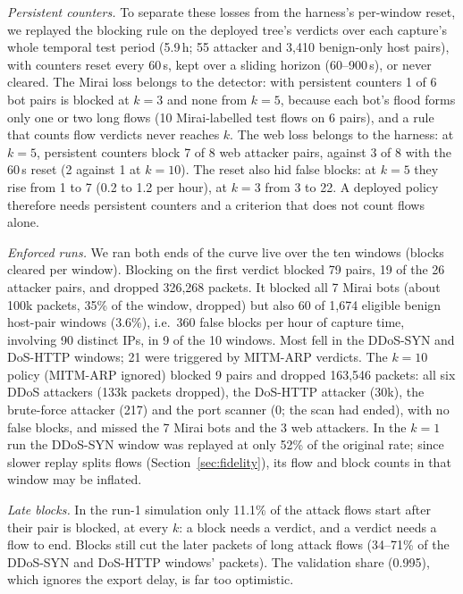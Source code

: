 \emph{Persistent counters.} To separate these losses from the harness's per-window reset, we replayed the blocking rule on the deployed tree's verdicts over each capture's whole temporal test period (5.9\,h; 55 attacker and 3,410 benign-only host pairs), with counters reset every 60\,s, kept over a sliding horizon (60--900\,s), or never cleared. The Mirai loss belongs to the detector: with persistent counters 1 of 6 bot pairs is blocked at $k=3$ and none from $k=5$, because each bot's flood forms only one or two long flows (10 Mirai-labelled test flows on 6 pairs), and a rule that counts flow verdicts never reaches $k$. The web loss belongs to the harness: at $k=5$, persistent counters block 7 of 8 web attacker pairs, against 3 of 8 with the 60\,s reset (2 against 1 at $k=10$). The reset also hid false blocks: at $k=5$ they rise from 1 to 7 (0.2 to 1.2 per hour), at $k=3$ from 3 to 22. A deployed policy therefore needs persistent counters and a criterion that does not count flows alone.

\emph{Enforced runs.} We ran both ends of the curve live over the ten windows (blocks cleared per window). Blocking on the first verdict blocked 79 pairs, 19 of the 26 attacker pairs, and dropped 326,268 packets. It blocked all 7 Mirai bots (about 100k packets, 35\% of the window, dropped) but also 60 of 1,674 eligible benign host-pair windows (3.6\%), i.e.\ 360 false blocks per hour of capture time, involving 90 distinct IPs, in 9 of the 10 windows. Most fell in the DDoS-SYN and DoS-HTTP windows; 21 were triggered by MITM-ARP verdicts. The $k=10$ policy (MITM-ARP ignored) blocked 9 pairs and dropped 163,546 packets: all six DDoS attackers (133k packets dropped), the DoS-HTTP attacker (30k), the brute-force attacker (217) and the port scanner (0; the scan had ended), with no false blocks, and missed the 7 Mirai bots and the 3 web attackers. In the $k=1$ run the DDoS-SYN window was replayed at only 52\% of the original rate; since slower replay splits flows (Section~\ref{sec:fidelity}), its flow and block counts in that window may be inflated.

\emph{Late blocks.} In the run-1 simulation only 11.1\% of the attack flows start after their pair is blocked, at every $k$: a block needs a verdict, and a verdict needs a flow to end. Blocks still cut the later packets of long attack flows (34--71\% of the DDoS-SYN and DoS-HTTP windows' packets). The validation share (0.995), which ignores the export delay, is far too optimistic.
